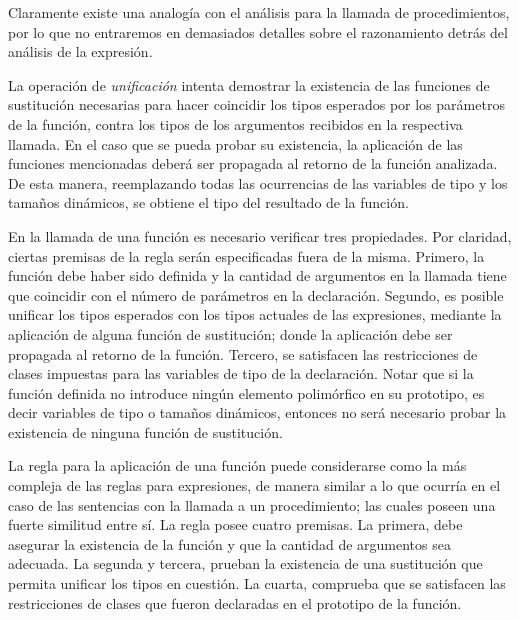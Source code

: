Claramente existe una analogía con el análisis para la llamada de procedimientos, por lo que no entraremos en demasiados detalles sobre el razonamiento detrás del análisis de la expresión.

La operación de \textit{unificación} intenta demostrar la existencia de las funciones de sustitución necesarias para hacer coincidir los tipos esperados por los parámetros de la función, contra los tipos de los argumentos recibidos en la respectiva llamada.
En el caso que se pueda probar su existencia, la aplicación de las funciones mencionadas deberá ser propagada al retorno de la función analizada.
De esta manera, reemplazando todas las ocurrencias de las variables de tipo y los tamaños dinámicos, se obtiene el tipo del resultado de la función.

En la llamada de una función es necesario verificar tres propiedades.
Por claridad, ciertas premisas de la regla serán especificadas fuera de la misma.
Primero, la función debe haber sido definida y la cantidad de argumentos en la llamada tiene que coincidir con el número de parámetros en la declaración.
Segundo, es posible unificar los tipos esperados con los tipos actuales de las expresiones, mediante la aplicación de alguna función de sustitución; donde la aplicación debe ser propagada al retorno de la función.
Tercero, se satisfacen las restricciones de clases impuestas para las variables de tipo de la declaración.
Notar que si la función definida no introduce ningún elemento polimórfico en su prototipo, es decir variables de tipo o tamaños dinámicos, entonces no será necesario probar la existencia de ninguna función de sustitución.
\fi

La regla para la aplicación de una función puede considerarse como la más compleja de las reglas para expresiones, de manera similar a lo que ocurría
en el caso de las sentencias con la llamada a un procedimiento; las cuales poseen una fuerte similitud entre sí.
La regla posee cuatro premisas.
La primera, debe asegurar la existencia de la función y que la cantidad de argumentos sea adecuada.
La segunda y tercera, prueban la existencia de una sustitución que permita unificar los tipos en cuestión.
La cuarta, comprueba que se satisfacen las restricciones de clases que fueron declaradas en el prototipo de la función.

